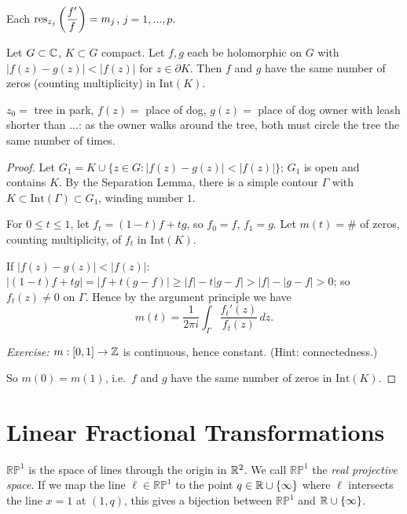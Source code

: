 \documentclass[11pt]{article}
\begin{document}
\begin{proposition}
Each $\operatorname{res}_{z_j}\left(\dfrac{f'}{f}\right) = m_j$, $j=1,\dots,p$.
\end{proposition}

\begin{theorem}
Let $G\subset{\mathbb{C}}$, $K\subset G$ compact. Let $f,g$ each be holomorphic on $G$ with $|f(z)-g(z)| < |f(z)|$ for $z\in\partial K$. Then $f$ and $g$ have the same number of zeros (counting multiplicity) in $\mathrm{Int}(K)$.
\end{theorem}

\begin{remark}[Analogy]
$z_0=$ tree in park, $f(z)=$ place of dog, $g(z)=$ place of dog owner with leash shorter than $\dots$: as the owner walks around the tree, both must circle the tree the same number of times.
\end{remark}

\begin{proof}
Let $G_1 = K\cup\{z\in G : |f(z)-g(z)|<|f(z)|\}$; $G_1$ is open and contains $K$. By the Separation Lemma, there is a simple contour $\Gamma$ with $K\subset\mathrm{Int}(\Gamma)\subset G_1$, winding number $1$.

For $0\le t\le1$, let $f_t = (1-t)f+tg$, so $f_0=f$, $f_1=g$. Let $m(t) = \#$ of zeros, counting multiplicity, of $f_t$ in $\mathrm{Int}(K)$.

If $|f(z)-g(z)|<|f(z)|$: $|(1-t)f+tg| = |f+t(g-f)| \ge |f|-t|g-f| > |f|-|g-f| > 0$; so $f_t(z)\ne0$ on $\Gamma$. Hence by the argument principle we have
\[
m(t) = \frac{1}{2\pi i}\int_\Gamma \frac{f_t'(z)}{f_t(z)}\,dz.
\]

\emph{Exercise:} $m:[0,1]\to{\mathbb{Z}}$ is continuous, hence constant. (Hint: connectedness.)

So $m(0)=m(1)$, i.e.\ $f$ and $g$ have the same number of zeros in $\mathrm{Int}(K)$.
\end{proof}

\newpage
\section{Linear Fractional Transformations}

\begin{definition}
$\mathbb{RP}^1$ is the space of lines through the origin in ${\mathbb{R}}^2$. We call $\mathbb{RP}^1$ the \emph{real projective space}. If we map the line $\ell \in \mathbb{RP}^1$ to the point $q\in{\mathbb{R}}\cup\{\infty\}$ where $\ell$ intersects the line $x=1$ at $(1,q)$, this gives a bijection between $\mathbb{RP}^1$ and ${\mathbb{R}}\cup\{\infty\}$.
\end{definition}
\end{document}
